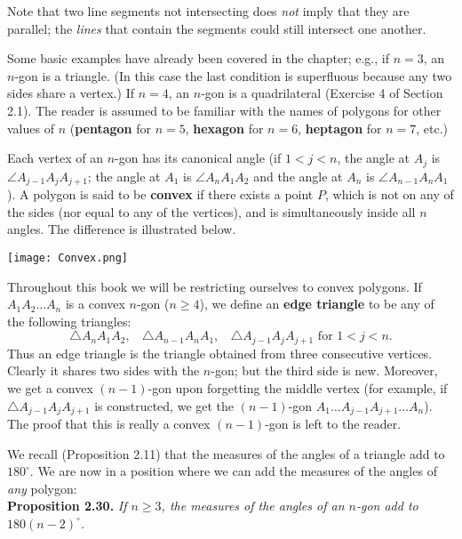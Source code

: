\documentclass[leqno]{book}
\begin{document}
\noindent Note that two line segments not intersecting does \emph{not} imply that they are parallel; the \emph{lines} that contain the segments could still intersect one another.

Some basic examples have already been covered in the chapter; e.g., if $n=3$, an $n$-gon is a triangle.  (In this case the last condition is superfluous because any two sides share a vertex.)  If $n=4$, an $n$-gon is a quadrilateral (Exercise 4 of Section 2.1).  The reader is assumed to be familiar with the names of polygons for other values of $n$ (\textbf{pentagon} for $n=5$, \textbf{hexagon} for $n=6$, \textbf{heptagon} for $n=7$, etc.)

Each vertex of an $n$-gon has its canonical angle (if $1<j<n$, the angle at $A_j$ is $\angle A_{j-1}A_jA_{j+1}$; the angle at $A_1$ is $\angle A_nA_1A_2$ and the angle at $A_n$ is $\angle A_{n-1}A_nA_1$).  A polygon is said to be \textbf{convex} if there exists a point $P$, which is not on any of the sides (nor equal to any of the vertices), and is simultaneously inside all $n$ angles.  The difference is illustrated below.
\begin{center}\texttt{[image: Convex.png]}\end{center}
Throughout this book we will be restricting ourselves to convex polygons.  If $A_1A_2\dots A_n$ is a convex $n$-gon ($n\geqslant 4$), we define an \textbf{edge triangle} to be any of the following triangles:
$$\triangle A_nA_1A_2,~~~~\triangle A_{n-1}A_nA_1,~~~~\triangle A_{j-1}A_jA_{j+1}\text{ for }1<j<n.$$
Thus an edge triangle is the triangle obtained from three consecutive vertices.  Clearly it shares two sides with the $n$-gon; but the third side is new.  Moreover, we get a convex $(n-1)$-gon upon forgetting the middle vertex (for example, if $\triangle A_{j-1}A_jA_{j+1}$ is constructed, we get the $(n-1)$-gon $A_1\dots A_{j-1}A_{j+1}\dots A_n$).  The proof that this is really a convex $(n-1)$-gon is left to the reader.

We recall (Proposition 2.11) that the measures of the angles of a triangle add to $180^\circ$.  We are now in a position where we can add the measures of the angles of \emph{any} polygon:\\

\noindent\textbf{Proposition 2.30.} \emph{If $n\geqslant 3$, the measures of the angles of an $n$-gon add to $180(n-2)^\circ$.}\\
\end{document}
